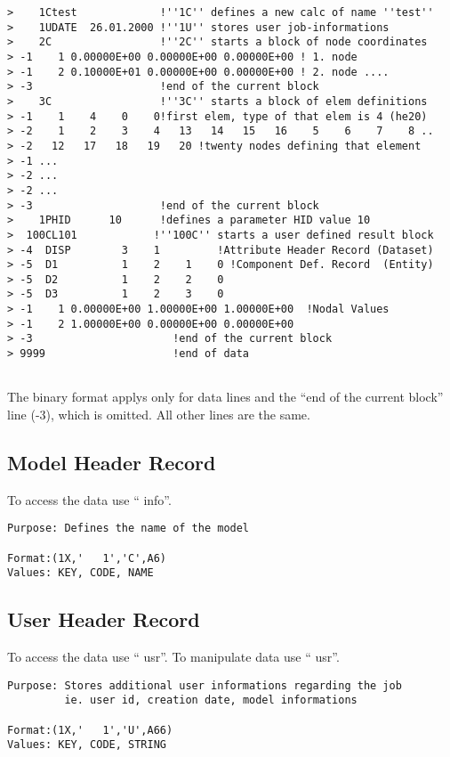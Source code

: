 \documentclass{article}
\begin{document}
\begin{verbatim}
>    1Ctest             !''1C'' defines a new calc of name ''test''
>    1UDATE  26.01.2000 !''1U'' stores user job-informations
>    2C                 !''2C'' starts a block of node coordinates
> -1    1 0.00000E+00 0.00000E+00 0.00000E+00 ! 1. node
> -1    2 0.10000E+01 0.00000E+00 0.00000E+00 ! 2. node ....
> -3                    !end of the current block
>    3C                 !''3C'' starts a block of elem definitions
> -1    1    4    0    0!first elem, type of that elem is 4 (he20)
> -2    1    2    3    4   13   14   15   16    5    6    7    8 ..
> -2   12   17   18   19   20 !twenty nodes defining that element
> -1 ...
> -2 ...
> -2 ...
> -3                    !end of the current block
>    1PHID      10      !defines a parameter HID value 10
>  100CL101            !''100C'' starts a user defined result block
> -4  DISP        3    1         !Attribute Header Record (Dataset)
> -5  D1          1    2    1    0 !Component Def. Record  (Entity)
> -5  D2          1    2    2    0
> -5  D3          1    2    3    0
> -1    1 0.00000E+00 1.00000E+00 1.00000E+00  !Nodal Values
> -1    2 1.00000E+00 0.00000E+00 0.00000E+00
> -3                      !end of the current block
> 9999                    !end of data
 
\end{verbatim}
The binary format applys only for data lines and the ``end of the current block'' line (-3), which is omitted.
All other lines are the same.

\subsection{\label{Model Header Record}Model Header Record}
To access the data use `` info''.
\begin{verbatim}
Purpose: Defines the name of the model

Format:(1X,'   1','C',A6)  
Values: KEY, CODE, NAME
\end{verbatim}

\subsection{\label{User Header Record}User Header Record}
To access the data use `` usr''.
To manipulate data use `` usr''.
\begin{verbatim}
Purpose: Stores additional user informations regarding the job
         ie. user id, creation date, model informations

Format:(1X,'   1','U',A66)  
Values: KEY, CODE, STRING
\end{verbatim}
\end{document}
